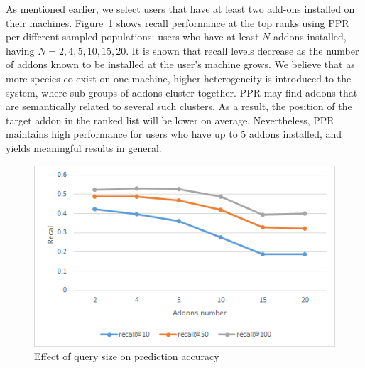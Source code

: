 \documentclass[11pt,oneside]{book}
\begin{document}
As mentioned earlier, we select users that have at least two add-ons installed on their machines. Figure~\ref{fig:addonsNumberGraph} shows recall performance at the top ranks using PPR per different sampled populations: users who have at least $N$ addons installed, having $N=2,4,5,10,15,20$. It is shown that recall levels decrease as the number of addons known to be installed at the user's machine grows. We believe that as more species co-exist on one machine, higher heterogeneity is introduced to the system, where sub-groups of addons cluster together. PPR may find addons that are semantically related to several such clusters. As a result, the position of the target addon in the ranked list will be lower on average. Nevertheless, PPR maintains high performance for users who have up to 5 addons installed, and yields meaningful results in general. 

\begin{figure}[!htbp]
\centering
\includegraphics[scale=1,angle=0]{figures/addonsNumberGraph.png}
\caption{Effect of query size on prediction accuracy}
\label{fig:addonsNumberGraph}
\end{figure}

\end{document}
